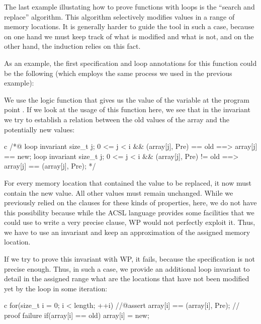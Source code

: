 The last example illustating how to prove functions
with loops is the ``search and replace'' algorithm. This algorithm
selectively modifies values in a range of memory locations. It is
generally harder to guide the tool in such a case, because on one hand
we must keep track of what is modified and what is not, and on the other
hand, the induction relies on this fact.


As an example, the first specification and loop annotations for
this function could be the following (which employs the same process we
used in the previous example):




We use the logic function  that gives
us the value of the variable  at the program point .
If we look at the usage of this function here, we see that in the
invariant we try to establish a relation between the old values of the
array and the potentially new values:


\begin{CodeBlock}{c}
/*@
  loop invariant \forall size_t j; 0 <= j < i && \at(array[j], Pre) == old
                   ==> array[j] == new;
  loop invariant \forall size_t j; 0 <= j < i && \at(array[j], Pre) != old
                   ==> array[j] == \at(array[j], Pre);
*/
\end{CodeBlock}



For every memory location that contained the value to be replaced, it now must
contain the new value. All other values must remain unchanged. While we
previously relied on the  clauses for these kinds of properties,
here, we do not have this possibility because while the ACSL language provides
some facilities that we could use to write a very precise 
clause, WP would not perfectly exploit it. Thus, we have to use an invariant and
keep an approximation of the assigned memory location.


If we try to prove this invariant with WP, it fails, because the
 specification is not precise enough. Thus, in such a case,
we provide an additional loop invariant to detail in the assigned range what are
the locations that have not been modified yet by the loop in some iteration:


\begin{CodeBlock}{c}
for(size_t i = 0; i < length; ++i){
    //@assert array[i] == \at(array[i], Pre); // proof failure
    if(array[i] == old) array[i] = new;
}
\end{CodeBlock}


